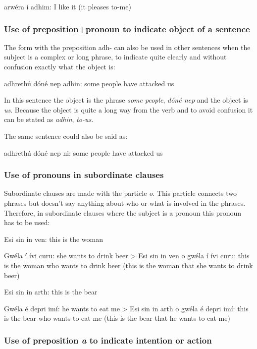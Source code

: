 arw\'{e}ra \'{i} adhim: I like it (it pleases to-me)

\subsubsection{Use of preposition+pronoun to indicate object of a sentence}

The form with the preposition adh- can also be used in other sentences when the subject is a complex or long phrase, to indicate quite clearly and without confusion exactly what the object is:

adhreth\'{u} d\'{o}n\'{e} nep adhin: some people have attacked us

In this sentence the object is the phrase \textit{some people}, \textit{d\'{o}n\'{e} nep} and the object is \textit{us}. Because the object is quite a long way from the verb and to avoid confusion it can be stated as \textit{adhin}, \textit{to-us}.

The same sentence could also be said as:

adhreth\'{u} d\'{o}n\'{e} nep ni: some people have attacked us

\subsubsection{Use of pronouns in subordinate clauses}

Subordinate clauses are made with the particle \textit{o}. This particle connects two phrases but doesn't say anything about who or what is involved in the phrases. Therefore, in subordinate clauses where the subject is a pronoun this pronoun has to be used:

Esi sin in ven: this is the woman

Gw\'{e}la \'{i} \'{i}vi curu: she wants to drink beer
> Esi sin in ven o gw\'{e}la \'{i} \'{i}vi curu: this is the woman who wants to drink beer (this is the woman that she wants to drink beer)

Esi sin in arth: this is the bear

Gw\'{e}la \'{e} depri im\'{i}: he wants to eat me
> Esi sin in arth o gw\'{e}la \'{e} depri im\'{i}: this is the bear who wants to eat me (this is the bear that he wants to eat me)

\subsubsection{Use of preposition \textit{a} to indicate intention or action}

